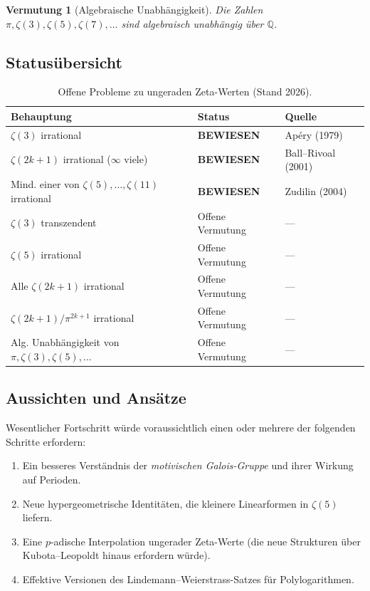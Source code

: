 \documentclass[12pt,a4paper]{amsart}
\newtheorem{vermutung}[theorem]{Vermutung}
\theoremstyle{definition}
\theoremstyle{remark}
\begin{document}
\begin{vermutung}[Algebraische Unabhängigkeit]
  Die Zahlen $\pi, \zeta(3), \zeta(5), \zeta(7), \ldots$ sind algebraisch
  unabhängig über $\mathbb{Q}$.
\end{vermutung}

\subsection*{Statusübersicht}

\begin{table}[h]
  \centering
  \caption{Offene Probleme zu ungeraden Zeta-Werten (Stand 2026).}
  \vspace{4pt}
  \begin{tabular}{@{}lll@{}}
    \toprule
    Behauptung & Status & Quelle \\
    \midrule
    $\zeta(3)$ irrational & \textbf{BEWIESEN} & Apéry (1979) \\
    $\zeta(2k+1)$ irrational ($\infty$ viele) & \textbf{BEWIESEN} & Ball--Rivoal (2001) \\
    Mind. einer von $\zeta(5),\ldots,\zeta(11)$ irrational & \textbf{BEWIESEN} & Zudilin (2004) \\
    $\zeta(3)$ transzendent & Offene Vermutung & --- \\
    $\zeta(5)$ irrational & Offene Vermutung & --- \\
    Alle $\zeta(2k+1)$ irrational & Offene Vermutung & --- \\
    $\zeta(2k+1)/\pi^{2k+1}$ irrational & Offene Vermutung & --- \\
    Alg. Unabhängigkeit von $\pi, \zeta(3), \zeta(5), \ldots$ & Offene Vermutung & --- \\
    \bottomrule
  \end{tabular}
\end{table}

\subsection*{Aussichten und Ansätze}

Wesentlicher Fortschritt würde voraussichtlich einen oder mehrere der folgenden
Schritte erfordern:
\begin{enumerate}[leftmargin=2em]
  \item Ein besseres Verständnis der \emph{motivischen Galois-Gruppe} und ihrer
        Wirkung auf Perioden.
  \item Neue hypergeometrische Identitäten, die kleinere Linearformen in $\zeta(5)$
        liefern.
  \item Eine $p$-adische Interpolation ungerader Zeta-Werte (die neue Strukturen
        über Kubota--Leopoldt hinaus erfordern würde).
  \item Effektive Versionen des Lindemann--Weierstrass-Satzes für Polylogarithmen.
\end{enumerate}
\end{document}
